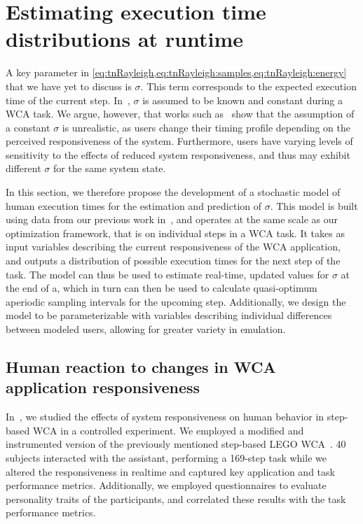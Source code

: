 \section{Estimating execution time distributions at runtime}\label{sec:model}

A key parameter in \cref{eq:tnRayleigh,eq:tnRayleigh:samples,eq:tnRayleigh:energy} that we have yet to discuss is \ensuremath{\sigma}.
This term corresponds to the expected execution time of the current step.
In~\cite{moothedath2021energy,moothedath2022energy1,moothedath2022energy2}, \ensuremath{\sigma} is assumed to be known and constant during a \gls{WCA} task.
We argue, however, that works such as~\cite{olguinmunoz2021impact} show that the assumption of a constant \ensuremath{\sigma} is unrealistic, as users change their timing profile depending on the perceived responsiveness of the system.
Furthermore, users have varying levels of sensitivity to the effects of reduced system responsiveness, and thus may exhibit different \ensuremath{\sigma} for the same system state.

In this section, we therefore propose the development of a stochastic model of human execution times for the estimation and prediction of \ensuremath{\sigma}.
This model is built using data from our previous work in~\cite{olguinmunoz2021impact}, and operates at the same scale as our optimization framework, that is on individual steps in a \gls{WCA} task.
It takes as input variables describing the current responsiveness of the \gls{WCA} application, and outputs a distribution of possible execution times for the next step of the task.
The model can thus be used to estimate real-time, updated values for \ensuremath{\sigma} at the end of a, which in turn can then be used to calculate quasi-optimum aperiodic sampling intervals for the upcoming step.
Additionally, we design the model to be parameterizable with variables describing individual differences between modeled users, allowing for greater variety in emulation.

\subsection{Human reaction to changes in \gls{WCA} application responsiveness}\label{sec:model:insights}

In~\cite{olguinmunoz2021impact}, we studied the effects of system responsiveness on human behavior in step-based \gls{WCA} in a controlled experiment.
We employed a modified and instrumented version of the previously mentioned step-based LEGO \gls{WCA}~\cite{chen2015early}.
\num{40} subjects interacted with the assistant, performing a \num{169}-step task while we altered the responsiveness in realtime and captured key application and task performance metrics.
Additionally, we employed questionnaires to evaluate personality traits of the participants, and correlated these results with the task performance metrics.

